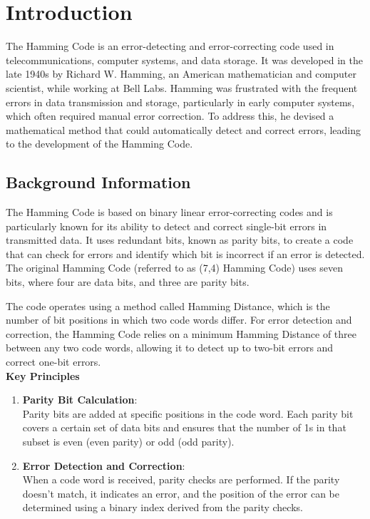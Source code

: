 \documentclass{article}
\numberwithin{equation}{section}
\numberwithin{figure}{section}
\numberwithin{table}{section}
\begin{document}
\section{Introduction}
The Hamming Code is an error-detecting and error-correcting code used in telecommunications, computer systems, and data storage. It was developed in the late 1940s by Richard W. Hamming, an American mathematician and computer scientist, while working at Bell Labs. Hamming was frustrated with the frequent errors in data transmission and storage, particularly in early computer systems, which often required manual error correction. To address this, he devised a mathematical method that could automatically detect and correct errors, leading to the development of the Hamming Code.
\cite{6772729}



\subsection{Background Information}
The Hamming Code is based on binary linear error-correcting codes and is particularly known for its ability to detect and correct single-bit errors in transmitted data. It uses redundant bits, known as parity bits, to create a code that can check for errors and identify which bit is incorrect if an error is detected. The original Hamming Code (referred to as (7,4) Hamming Code) uses seven bits, where four are data bits, and three are parity bits.

The code operates using a method called Hamming Distance, which is the number of bit positions in which two code words differ. For error detection and correction, the Hamming Code relies on a minimum Hamming Distance of three between any two code words, allowing it to detect up to two-bit errors and correct one-bit errors.\\


\textbf{Key Principles}
    \begin{enumerate}
        \item \textbf{Parity Bit Calculation}: \\ Parity bits are added at specific positions in the code word. Each parity bit covers a certain set of data bits and ensures that the number of 1s in that subset is even (even parity) or odd (odd parity).
        \item \textbf{Error Detection and Correction}: \\ When a code word is received, parity checks are performed. If the parity doesn’t match, it indicates an error, and the position of the error can be determined using a binary index derived from the parity checks.
    \end{enumerate}
\end{document}
